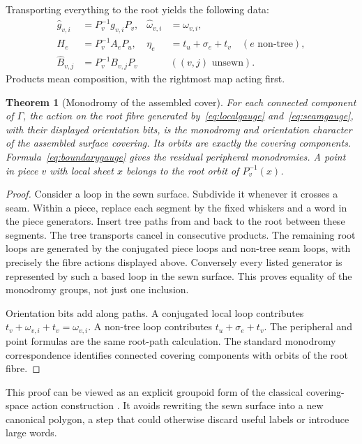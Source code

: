 \documentclass[11pt,a4paper]{article}
\newtheorem{theorem}{Theorem}[section]
\theoremstyle{definition}\newtheorem{definition}[theorem]{Definition}
\theoremstyle{remark}\newtheorem{remark}[theorem]{Remark}
\begin{document}
Transporting everything to the root yields the following data:
\begin{align}
 \widehat g_{v,i}&=P_v^{-1}g_{v,i}P_v,
 &\widehat\omega_{v,i}&=\omega_{v,i},\label{eq:localgauge}\\
 H_e&=P_v^{-1}A_eP_u,
 &\eta_e&=t_u+\sigma_e+t_v\quad(e\text{ non-tree}),\label{eq:seamgauge}\\
 \widehat B_{v,j}&=P_v^{-1}B_{v,j}P_v
 &&((v,j)\text{ unsewn}).\label{eq:boundarygauge}
\end{align}
Products mean composition, with the rightmost map acting first.

\begin{theorem}[Monodromy of the assembled cover]\label{thm:gauge}
For each connected component of $\Gamma$, the action on the root fibre
generated by~\eqref{eq:localgauge} and~\eqref{eq:seamgauge}, with their
displayed orientation bits, is the monodromy and orientation character of
the assembled surface covering. Its orbits are exactly the covering
components. Formula~\eqref{eq:boundarygauge} gives the residual peripheral
monodromies. A point in piece $v$ with local sheet $x$ belongs to the root
orbit of $P_v^{-1}(x)$.
\end{theorem}
\begin{proof}
Consider a loop in the sewn surface. Subdivide it whenever it crosses a seam.
Within a piece, replace each segment by the fixed whiskers and a word in the
piece generators. Insert tree paths from and back to the root between these
segments. The tree transports cancel in consecutive products. The remaining
root loops are generated by the conjugated piece loops and non-tree seam
loops, with precisely the fibre actions displayed above. Conversely every
listed generator is represented by such a based loop in the sewn surface.
This proves equality of the monodromy groups, not just one inclusion.

Orientation bits add along paths. A conjugated local loop contributes
$t_v+\omega_{v,i}+t_v=\omega_{v,i}$. A non-tree loop contributes
$t_u+\sigma_e+t_v$. The peripheral and point formulas are the same root-path
calculation. The standard monodromy correspondence identifies connected
covering components with orbits of the root fibre.
\end{proof}

This proof can be viewed as an explicit groupoid form of the classical
covering-space action construction \cite[Section 1.3]{hatcher}. It avoids
rewriting the sewn surface into a new canonical polygon, a step that could
otherwise discard useful labels or introduce large words.
\end{document}
